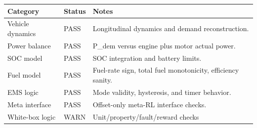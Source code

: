 \begin{tabular}{lll}
\toprule
Category & Status & Notes \\
\midrule
Vehicle dynamics & PASS & Longitudinal dynamics and demand reconstruction. \\
Power balance & PASS & P\_dem versus engine plus motor actual power. \\
SOC model & PASS & SOC integration and battery limits. \\
Fuel model & PASS & Fuel-rate sign, total fuel monotonicity, efficiency sanity. \\
EMS logic & PASS & Mode validity, hysteresis, and timer behavior. \\
Meta interface & PASS & Offset-only meta-RL interface checks. \\
White-box logic & WARN & Unit/property/fault/reward checks \\
\bottomrule
\end{tabular}
